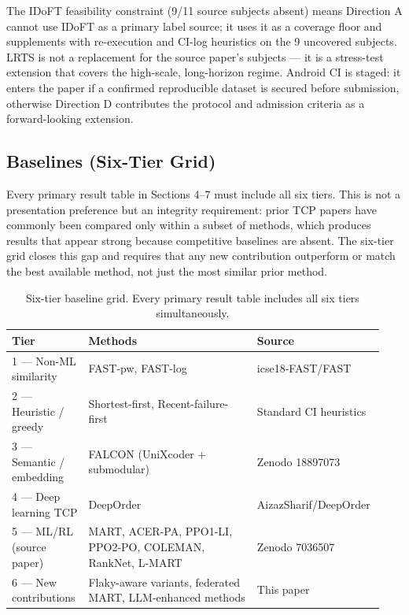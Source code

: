 \documentclass[conference]{IEEEtran}
\begin{document}
The IDoFT feasibility constraint (9/11 source subjects absent) means Direction A cannot use IDoFT as a primary label source; it uses it as a coverage floor and supplements with re-execution and CI-log heuristics on the 9 uncovered subjects. LRTS is not a replacement for the source paper's subjects — it is a stress-test extension that covers the high-scale, long-horizon regime. Android CI is staged: it enters the paper if a confirmed reproducible dataset is secured before submission, otherwise Direction D contributes the protocol and admission criteria as a forward-looking extension.


\subsection{Baselines (Six-Tier Grid)}

Every primary result table in Sections 4–7 must include all six tiers. This is not a presentation preference but an integrity requirement: prior TCP papers have commonly been compared only within a subset of methods, which produces results that appear strong because competitive baselines are absent. The six-tier grid closes this gap and requires that any new contribution outperform or match the best available method, not just the most similar prior method.


\begin{table}[t]
\caption{Six-tier baseline grid. Every primary result table includes all six tiers simultaneously.}
\centering
\begin{tabular}{@{}p{0.20\linewidth}p{0.44\linewidth}p{0.30\linewidth}@{}}
\toprule
\textbf{Tier} & \textbf{Methods} & \textbf{Source} \\
\midrule
1 --- Non-ML similarity & FAST-pw, FAST-log & icse18-FAST/FAST \cite{cruciani2019} \\
2 --- Heuristic / greedy & Shortest-first, Recent-failure-first & Standard CI heuristics \\
3 --- Semantic / embedding & FALCON (UniXcoder + submodular) & Zenodo 18897073 \cite{falcon2025} \\
4 --- Deep learning TCP & DeepOrder & AizazSharif/DeepOrder \cite{deeporder2021} \\
5 --- ML/RL (source paper) & MART, ACER-PA, PPO1-LI, PPO2-PO, COLEMAN, RankNet, L-MART & Zenodo 7036507 \cite{zhao2023} \\
6 --- New contributions & Flaky-aware variants, federated MART, LLM-enhanced methods & This paper \\
\bottomrule
\end{tabular}
\end{table}
\end{document}
